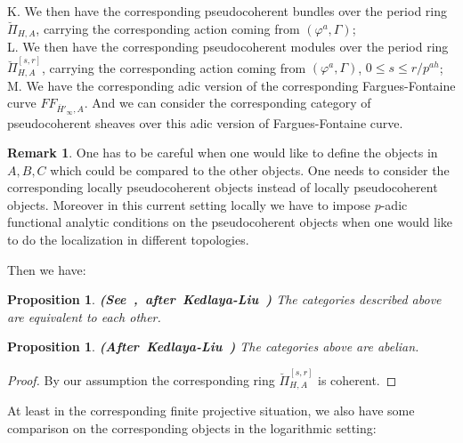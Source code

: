 \documentclass[12pt]{amsart}
\newtheorem{proposition}[theorem]{Proposition}
\theoremstyle{definition}
\newtheorem{remark}[theorem]{Remark}
\numberwithin{equation}{section}
\begin{document}
\noindent K. We then have the corresponding pseudocoherent bundles over the period ring ${\breve{\Pi}}_{H,A}$, carrying the corresponding action coming from $(\varphi^a,\Gamma)$;\\
\noindent L. We then have the corresponding pseudocoherent modules over the period ring ${\breve{\Pi}}^{[s,r]}_{H,A}$, carrying the corresponding action coming from $(\varphi^a,\Gamma)$, $0\leq s\leq r/p^{ah}$;\\
\noindent M. We have the corresponding adic version of the corresponding Fargues-Fontaine curve $FF_{\overline{H}'_\infty,A}$. And we can consider the corresponding category of pseudocoherent sheaves over this adic version of Fargues-Fontaine curve.


\begin{remark}
One has to be careful when one would like to define the objects in $A,B,C$ which could be compared to the other objects. One needs to consider the corresponding locally pseudocoherent objects instead of locally pseudocoherent objects. Moreover in this current setting locally we have to impose $p$-adic functional analytic conditions on the pseudocoherent objects when one would like to do the localization in different topologies.
\end{remark}




\indent Then we have:


\begin{proposition}\mbox{\bf{(See \cite[Proposition 5.51]{XT2}, after Kedlaya-Liu \cite[Theorem 5.9.4]{KL16})}}
The categories described above are equivalent to each other.	
\end{proposition}



\begin{proposition} \mbox{\bf{(After Kedlaya-Liu \cite[Theorem 5.9.4]{KL16})}}
The categories above are abelian.	
\end{proposition}


\begin{proof}
By our assumption the corresponding ring $\breve{\Pi}^{[s,r]}_{H,A}$ is coherent.	
\end{proof}

\indent At least in the corresponding finite projective situation, we also have some comparison on the corresponding objects in the logarithmic setting:
\end{document}

